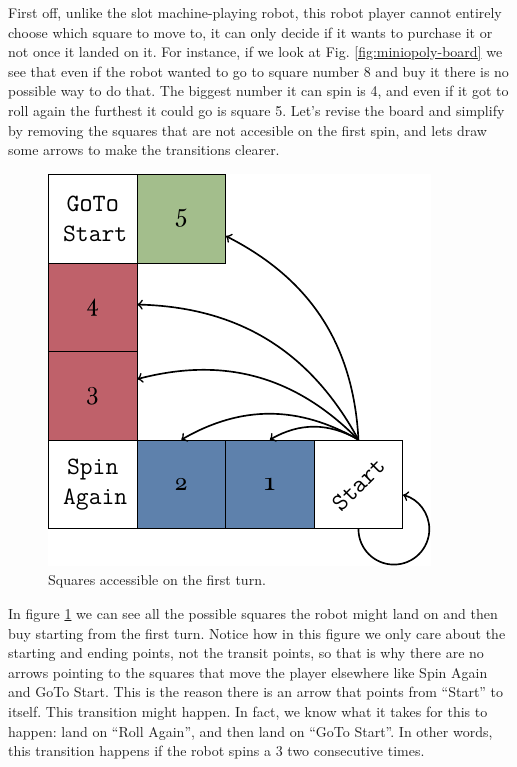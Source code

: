 First off, unlike the slot machine-playing robot, this robot 
player cannot entirely choose which square to move to, it can 
only decide if it wants to purchase it or not once it landed on 
it.  For instance, if we look at Fig. \ref{fig:miniopoly-board} 
we see that even if the robot wanted to go to square number 8 
and buy it there is no possible way to do that. The biggest 
number it can spin is 4, and even if it got to roll again the 
furthest it could go is square 5. Let's revise the board and 
simplify by removing the squares that are not accesible on the 
first spin, and lets draw some arrows to make the transitions 
clearer.

\begin{figure}[h]
	\centering
	\includegraphics[width=.75\textwidth]{img/diagram-start.pdf}
	\caption{Squares accessible on the first turn.}
	\label{fig:miniopoly-diagram-start}
\end{figure}

In figure \ref{fig:miniopoly-diagram-start} we can see all the 
possible squares the robot might land on and then buy starting 
from the first turn. Notice how in this figure we only care 
about the starting and ending points, not the transit points, 
so that is why there are no arrows pointing to the squares that 
move the player elsewhere like Spin Again and GoTo Start.
This is the reason there is an arrow that points from ``Start'' 
to itself. This transition might happen. In fact, we know what 
it takes for this to happen: land on ``Roll Again'', and then 
land on ``GoTo Start''. In other words, this transition happens 
if the robot spins a 3 two consecutive times.

